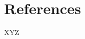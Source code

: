 \documentclass[conference]{IEEEtran}
\begin{document}
        
    






\section{References}
XYZ
\end{document}
